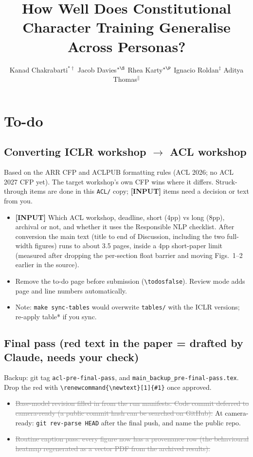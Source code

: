 \documentclass{article}
\title{How Well Does Constitutional Character Training Generalise Across Personas?}
\author{%
  Kanad Chakrabarti$^{*\dagger}$ \quad
  Jacob Davies$^{*\S}$ \quad
  Rhea Karty$^{*\P}$ \quad
  Ignacio Roldan$^{\ddagger}$ \quad
  Aditya Thomas$^{\|}$
}
\newcommand{\done}[1]{\textcolor{gray}{\sout{#1}}}
\begin{document}
\newif\iftodos
\todosfalse
\iftodos
\thispagestyle{empty}
\section*{To-do}

\subsection*{Converting ICLR workshop $\rightarrow$ ACL workshop}
Based on the ARR CFP and ACLPUB formatting rules (ACL 2026; no ACL 2027 CFP yet). The target workshop's own CFP wins where it differs. Struck-through items are done in this \texttt{ACL/} copy; \textbf{[INPUT]} items need a decision or text from you.
\begin{itemize}
  \item \textbf{[INPUT]} Which ACL workshop, deadline, short (4pp) vs long (8pp), archival or not, and whether it uses the Responsible NLP checklist. After conversion the main text (title to end of Discussion, including the two full-width figures) runs to about 3.5 pages, inside a 4pp short-paper limit (measured after dropping the per-section float barrier and moving Figs.~1--2 earlier in the source).
  \item Remove the to-do page before submission (\texttt{\textbackslash todosfalse}). Review mode adds page and line numbers automatically.
  \item Note: \texttt{make sync-tables} would overwrite \texttt{tables/} with the ICLR versions; re-apply table* if you sync.
\end{itemize}

\subsection*{Final pass (red text in the paper = drafted by Claude, needs your check)}
Backup: git tag \texttt{acl-pre-final-pass}, and \texttt{main\_backup\_pre-final-pass.tex}. Drop the red with \texttt{\textbackslash renewcommand\{\textbackslash newtext\}[1]\{\#1\}} once approved.
\begin{itemize}
  \item \done{Base-model revision filled in from the run manifests. Code commit deferred to camera-ready (a public commit hash can be searched on GitHub).} At camera-ready: \texttt{git rev-parse HEAD} after the final push, and name the public repo.
  \item \done{Routine caption pass: every figure now has a provenance row (the behavioural heatmap regenerated as a vector PDF from the archived results).}
\end{itemize}
\end{document}

